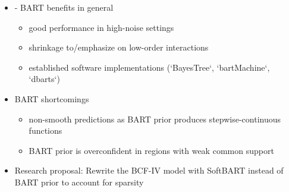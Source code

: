 \begin{itemize}
\item - BART benefits in general %
\begin{itemize}
    \item good performance in high-noise settings 
    \item shrinkage to/emphasize on low-order interactions
    \item established software implementations (`BayesTree`, `bartMachine`, `dbarts`)
\end{itemize}  
\item BART shortcomings %
\begin{itemize}
    \item non-smooth predictions as BART prior produces stepwise-continuous functions
    \item BART prior is overconfident in regions with weak common support
\end{itemize}
\item Research proposal: Rewrite the BCF-IV model with SoftBART instead of BART prior to account for sparsity
\end{itemize}



